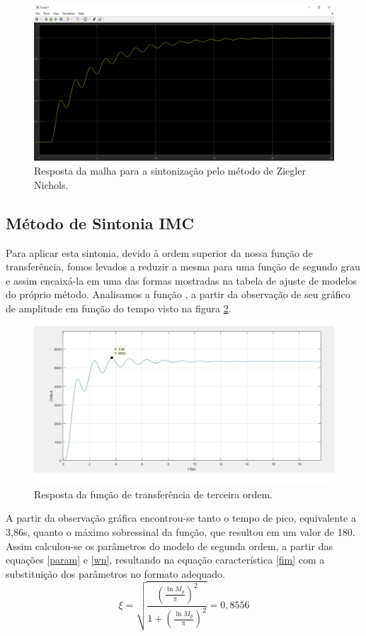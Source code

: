 \documentclass[article,12pt,oneside,a4paper,english,brazil,sumario=tradicional]{abntex2}
\begin{document}
\begin{figure}[H]
    \centering
    \includegraphics[scale=0.22]{zncerto.jpg}
    \caption{Resposta da malha para a sintonização pelo método de Ziegler Nichols.}
    \label{sintZN}
\end{figure}


\subsection{\large Método de Sintonia IMC}
Para aplicar esta sintonia, devido à ordem superior da nossa função de transferência, fomos levados a reduzir a mesma para uma função de segundo grau e assim encaixá-la em uma das formas mostradas na tabela de ajuste de modelos do próprio método. Analisamos a função , a partir da observação de seu gráfico de amplitude em função do tempo visto na figura \ref{func}.

\begin{figure}[H]
    \centering
    \includegraphics[scale=0.32]{func.jpg}
    \caption{Resposta da função de transferência de terceira ordem.}
    \label{func}
\end{figure}
A partir da observação gráfica encontrou-se tanto o tempo de pico, equivalente a 3,86s, quanto o máximo sobressinal da função, que resultou em um valor de 180. Assim calculou-se os parâmetros do modelo de segunda ordem, a partir das equações \ref{param} e \ref{wn}, resultando na equação característica \ref{fim} com a substituição dos parâmetros no formato adequado.
\begin{equation}
    \xi =\sqrt{\frac{{(\frac{\ln{M_p}}{\pi})}^2}{1+{(\frac{\ln{M_p}}{\pi})}^2}}=0,8556
   \label{param} 
\end{equation}
\end{document}
